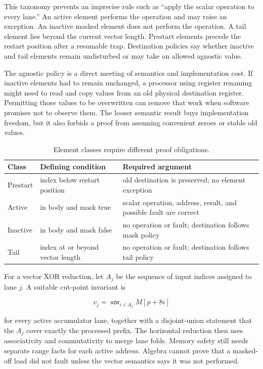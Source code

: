 This taxonomy prevents an imprecise rule such as ``apply the scalar operation
to every lane.'' An active element performs the operation and may raise an
exception. An inactive masked element does not perform the operation. A tail
element lies beyond the current vector length. Prestart elements precede the
restart position after a resumable trap. Destination policies say whether
inactive and tail elements remain undisturbed or may take an allowed agnostic
value.

The agnostic policy is a direct meeting of semantics and implementation cost.
If inactive elements had to remain unchanged, a processor using register
renaming might need to read and copy values from an old physical destination
register. Permitting those values to be overwritten can remove that work when
software promises not to observe them. The looser semantic result buys
implementation freedom, but it also forbids a proof from assuming convenient
zeroes or stable old values.

\begin{table}[htbp]
\centering
\caption{Element classes require different proof obligations.}
\begin{tabular}{@{}p{}p{}p{}@{}}
\toprule
Class & Defining condition & Required argument \\
\midrule
Prestart & index below restart position & old destination is preserved; no element exception \\
Active & in body and mask true & scalar operation, address, result, and possible fault are correct \\
Inactive & in body and mask false & no operation or fault; destination follows mask policy \\
Tail & index at or beyond vector length & no operation or fault; destination follows tail policy \\
\bottomrule
\end{tabular}
\end{table}

For a vector XOR reduction, let \(A_j\) be the sequence of input indices
assigned to lane \(j\). A suitable cut-point invariant is

\[
  v_j=\mathop{\mathsf{xor}}_{i\in A_j}M[p+8i]
\]

for every active accumulator lane, together with a disjoint-union statement
that the \(A_j\) cover exactly the processed prefix. The horizontal reduction
then uses associativity and commutativity to merge lane folds. Memory safety
still needs separate range facts for each active address. Algebra cannot prove
that a masked-off load did not fault unless the vector semantics says it was
not performed.

